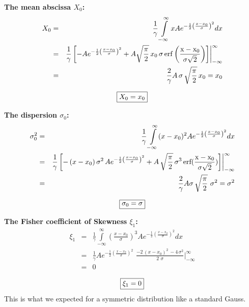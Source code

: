 \documentclass[10pt,a4paper]{report}
\def\epow{A{e^{-\frac{1}{2} {\left(\frac{x - x_0}{\sigma}\right)}^2}}}
\def\erf{\rm erf}
\begin{document}
\begin{flushleft}
\vspace{1cm} 
{\bf The mean abscissa $X_0$:} 
\begin{eqnarray*}
X_0 &=& \frac{1}{\gamma}\int\limits_{-\infty}^{\infty} x\epow dx\\
&=& \frac{1}{\gamma}  \left[ - \epow + 
    A\sqrt{\frac{\pi}{2}}\,x_0\, \sigma \, 
    \erf \left(\frac{x-x_0}{\sigma\sqrt{2}}\right) \right]
                    \biggr|_{-\infty}^{\infty}\\
&=& \frac{2}{\gamma}A\, \sigma \,\sqrt{\frac{\pi}{2}}\,x_0 = x_0
\end{eqnarray*} 

\begin{equation}
\framebox{$X_0 = x_0$}
\end{equation}

\vspace{1cm} 
{\bf The dispersion $\sigma_0$:}
\begin{eqnarray*}
\sigma^2_0 &=& \frac{1}{\gamma}\int\limits_{-\infty}^{\infty} (x-x_0)^{2}
\epow dx\\
&=& \frac{1}{\gamma}  \left[
-\,(x-x_0)\,\sigma^2\,\epow +
  A\,{\sqrt{{\frac{\pi }{2}}}}\,
   {{\sigma }^3}\,\erf ({\frac
        {x - x_0} {\sigma {\sqrt{2}}  }})
\right] \biggr|_{-\infty}^{\infty}\\
&=& \frac{2}{\gamma}A\sigma\, \sqrt{\frac{\pi}{2}} \,\,{\sigma}^2 
    = \sigma^2
\end{eqnarray*} 

\begin{equation}
\framebox{$\sigma_0 = \sigma$}
\end{equation}

\vspace{1cm} 
{\bf The Fisher coefficient of Skewness $\xi_1$:}
\begin{eqnarray*}
\xi_1 &=& \frac{1}{\gamma}\int\limits_{-\infty}^{\infty} \left({\frac{x-x_0}{\sigma}}\right)^{3}\epow dx\\
&=& \frac{1}{\gamma} { \epow\,\,
\frac{  -2\,{{\left( x - x_0 \right)}^2}\, - 
       4\,{{\sigma }^2} }{2\,\,
     {{\sigma }}}} \biggr|_{-\infty}^{\infty}\\
&=& 0
\end{eqnarray*}

\begin{equation}
\framebox{$\xi_1 = 0$}
\end{equation} 
This is what we expected for a symmetric distribution like a standard Gauss.


\end{flushleft}
\end{document}

